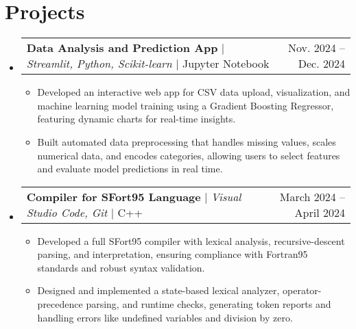 \documentclass[letterpaper,11pt]{article}
\makeatletter
\newcommand{\resumeItem}[1]{\item\small{{#1 \vspace{-2pt}}}}
\newcommand{\resumeProjectHeading}[2]{
    \item
    \begin{tabular*}{0.97\textwidth}{l@{\extracolsep{\fill}}r}
      \small#1 & #2 \\
    \end{tabular*}\vspace{-7pt}
}
\newcommand{\resumeSubHeadingListStart}{\begin{itemize}[leftmargin=0.15in, label={}]}
\newcommand{\resumeSubHeadingListEnd}{\end{itemize}}
\newcommand{\resumeItemListStart}{\begin{itemize}}
\newcommand{\resumeItemListEnd}{\end{itemize}\vspace{-5pt}}
\makeatother
\begin{document}
\section{Projects}
    \resumeSubHeadingListStart
      \resumeProjectHeading
          {\textbf{Data Analysis and Prediction App} $|$ \emph{Streamlit, Python, Scikit-learn} $|$ Jupyter Notebook} {Nov. 2024 – Dec. 2024}
          \resumeItemListStart
            \resumeItem{Developed an interactive web app for CSV data upload, visualization, and machine learning model training using a Gradient Boosting Regressor, featuring dynamic charts for real-time insights.}
            \resumeItem{Built automated data preprocessing that handles missing values, scales numerical data, and encodes categories, allowing users to select features and evaluate model predictions in real time.}
          \resumeItemListEnd
      \resumeProjectHeading
          {\textbf{Compiler for SFort95 Language} $|$ \emph{Visual Studio Code, Git} $|$ C++} {March 2024 – April 2024}
          \resumeItemListStart
            \resumeItem{Developed a full SFort95 compiler with lexical analysis, recursive-descent parsing, and interpretation, ensuring compliance with Fortran95 standards and robust syntax validation.}
            \resumeItem{Designed and implemented a state-based lexical analyzer, operator-precedence parsing, and runtime checks, generating token reports and handling errors like undefined variables and division by zero.}
          \resumeItemListEnd
    \resumeSubHeadingListEnd
\end{document}
